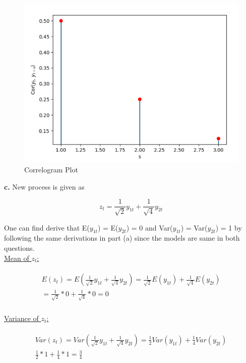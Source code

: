 \documentclass{article}
\begin{document}
\begin{figure}[h]
    \centering
    \includegraphics[scale=0.40]{corr.png}
    \caption{Correlogram Plot}
    \label{fig:my_label}
\end{figure}

\newpage

\textbf{c.} New process is given as 

\begin{equation}
    z_t = \frac{1}{\sqrt{2}}y_{1t} + \frac{1}{\sqrt{4}}y_{2t}
\end{equation}

One can find derive that E($y_{1t}$) = E($y_{2t}$) = 0 and Var($y_{1t}$) = Var($y_{2t}$) = 1 by following the same derivations in part (a) since the models are same in both questions. 
\\

\underline{Mean of $z_t$:}

\begin{align}
    \begin{split}
         E(z_t) = E(\frac{1}{\sqrt{2}}y_{1t} + \frac{1}{\sqrt{4}}y_{2t}) = \frac{1}{\sqrt{2}} E(y_{1t}) + \frac{1}{\sqrt{4}} E(y_{2t}) \\
         = \frac{1}{\sqrt{2}}*0 + \frac{1}{\sqrt{4}}*0 = 0
    \end{split}
\end{align}
\\

\underline{Variance of $z_t$:}

\begin{align}
    \begin{split}
        Var(z_t) = Var(\frac{1}{\sqrt{2}}y_{1t} + \frac{1}{\sqrt{4}}y_{2t}) = \frac{1}{2}Var(y_{1t}) + \frac{1}{4}Var(y_{2t}) \\
        \frac{1}{2}*1 + \frac{1}{4}*1 = \frac{3}{4}
    \end{split} 
\end{align}
\end{document}
